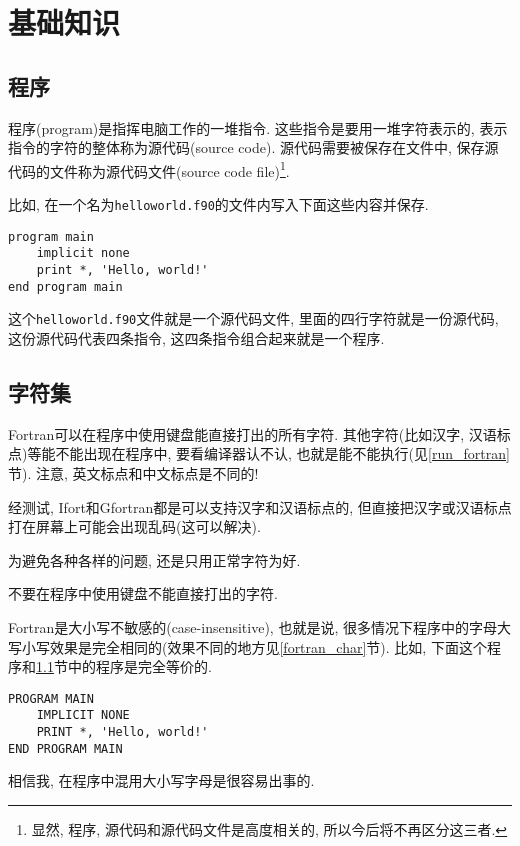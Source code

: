 \chapter{基础知识}

\section{程序}\label{fortran_program}

程序(program)是指挥电脑工作的一堆指令. 这些指令是要用一堆字符表示的, 表示指令的字符的整体称为源代码(source code). 源代码需要被保存在文件中, 保存源代码的文件称为源代码文件(source code file)\footnote{
    显然, 程序, 源代码和源代码文件是高度相关的, 所以今后将不再区分这三者.
}.

比如, 在一个名为\texttt{helloworld.f90}的文件内写入下面这些内容并保存.
\begin{lstlisting}
program main
    implicit none
    print *, 'Hello, world!'
end program main
\end{lstlisting}
这个\texttt{helloworld.f90}文件就是一个源代码文件, 里面的四行字符就是一份源代码, 这份源代码代表四条指令, 这四条指令组合起来就是一个程序.

\section{字符集}

Fortran可以在程序中使用键盘能直接打出的所有字符. 其他字符(比如汉字, 汉语标点)等能不能出现在程序中, 要看编译器认不认, 也就是能不能执行(见\ref{run_fortran}节). 注意, 英文标点和中文标点是不同的!

经测试, Ifort和Gfortran都是可以支持汉字和汉语标点的, 但直接把汉字或汉语标点打在屏幕上可能会出现乱码(这可以解决).

为避免各种各样的问题, 还是只用正常字符为好.

\begin{convention}
    不要在程序中使用键盘不能直接打出的字符.
\end{convention}

Fortran是大小写不敏感的(case-insensitive), 也就是说, 很多情况下程序中的字母大写小写效果是完全相同的(效果不同的地方见\ref{fortran_char}节). 比如, 下面这个程序和\ref{fortran_program}节中的程序是完全等价的.
\begin{lstlisting}
PROGRAM MAIN
    IMPLICIT NONE
    PRINT *, 'Hello, world!'
END PROGRAM MAIN
\end{lstlisting}

相信我, 在程序中混用大小写字母是很容易出事的.

